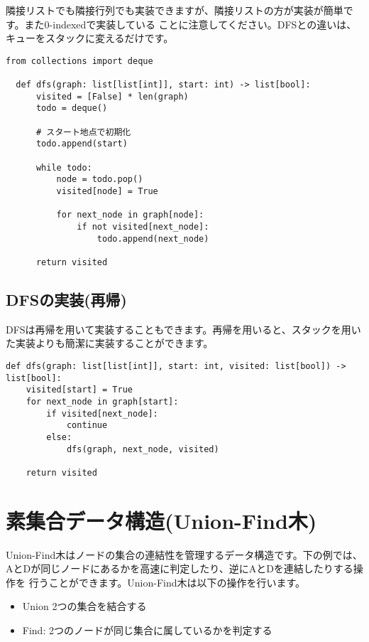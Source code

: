 \documentclass{jlreq}
\begin{document}
隣接リストでも隣接行列でも実装できますが、隣接リストの方が実装が簡単です。また0-indexedで実装している
ことに注意してください。DFSとの違いは、キューをスタックに変えるだけです。

\begin{lstlisting}[caption=深さ優先探索ヒープの実装, label=dfs, frame=TRBL, label={dfs}]
  from collections import deque

  def dfs(graph: list[list[int]], start: int) -> list[bool]:
      visited = [False] * len(graph)
      todo = deque()
      
      # スタート地点で初期化
      todo.append(start)
      
      while todo:
          node = todo.pop()
          visited[node] = True
          
          for next_node in graph[node]:
              if not visited[next_node]:
                  todo.append(next_node)
                  
      return visited
\end{lstlisting}
\subsection{DFSの実装(再帰)}
DFSは再帰を用いて実装することもできます。再帰を用いると、スタックを用いた実装よりも簡潔に実装することができます。

\begin{lstlisting}[caption=深さ優先探索再帰の実装, label=dfs_recursive, frame=TRBL, label={dfs_recursive}]
def dfs(graph: list[list[int]], start: int, visited: list[bool]) -> list[bool]:   
    visited[start] = True
    for next_node in graph[start]:
        if visited[next_node]:
            continue
        else:
            dfs(graph, next_node, visited)
    
    return visited
\end{lstlisting}

\newpage

\section{素集合データ構造(Union-Find木)}
Union-Find木はノードの集合の連結性を管理するデータ構造です。下の例では、AとDが同じノードにあるかを高速に判定したり、逆にAとDを連結したりする操作を
行うことができます。Union-Find木は以下の操作を行います。

\vspace{0.5cm}

\begin{itemize}
  \item Union 2つの集合を結合する
  \item Find: 2つのノードが同じ集合に属しているかを判定する
\end{itemize}
\end{document}
